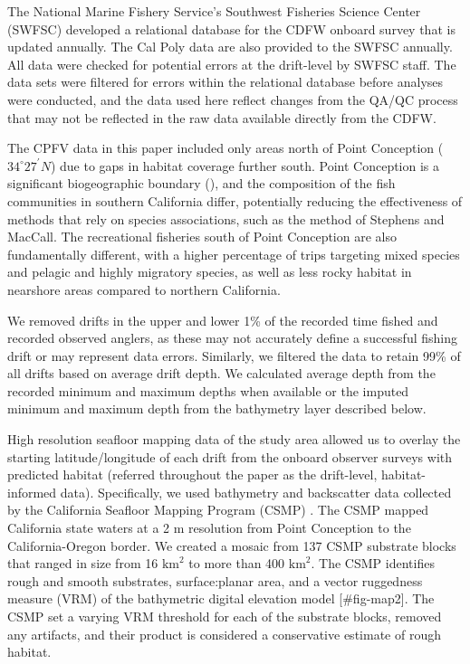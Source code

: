 \documentclass[
  12pt,
  authoryear,
  preprint,
  3p]{elsarticle}
\begin{document}
The National Marine Fishery Service's Southwest Fisheries Science Center
(SWFSC) developed a relational database for the CDFW onboard survey
\citeyearpar{Monk:2014:DRD} that is updated annually. The Cal Poly data
are also provided to the SWFSC annually. All data were checked for
potential errors at the drift-level by SWFSC staff. The data sets were
filtered for errors within the relational database before analyses were
conducted, and the data used here reflect changes from the QA/QC process
that may not be reflected in the raw data available directly from the
CDFW.

The CPFV data in this paper included only areas north of Point
Conception (\(34^\circ 27^\prime N\)) due to gaps in habitat coverage
further south. Point Conception is a significant biogeographic boundary
(\citet{Valentine:1966:NAM}), and the composition of the fish
communities in southern California differ, potentially reducing the
effectiveness of methods that rely on species associations, such as the
method of Stephens and MacCall. The recreational fisheries south of
Point Conception are also fundamentally different, with a higher
percentage of trips targeting mixed species and pelagic and highly
migratory species, as well as less rocky habitat in nearshore areas
compared to northern California.

We removed drifts in the upper and lower 1\% of the recorded time fished
and recorded observed anglers, as these may not accurately define a
successful fishing drift or may represent data errors. Similarly, we
filtered the data to retain 99\% of all drifts based on average drift
depth. We calculated average depth from the recorded minimum and maximum
depths when available or the imputed minimum and maximum depth from the
bathymetry layer described below.

High resolution seafloor mapping data of the study area allowed us to
overlay the starting latitude/longitude of each drift from the onboard
observer surveys with predicted habitat (referred throughout the paper
as the drift-level, habitat-informed data). Specifically, we used
bathymetry and backscatter data collected by the California Seafloor
Mapping Program (CSMP) \citep{Golden:2013:CSW, CSUMB:2014:CSM}. The CSMP
mapped California state waters at a 2 m resolution from Point Conception
to the California-Oregon border. We created a mosaic from 137 CSMP
substrate blocks that ranged in size from 16 \(\mathrm{km}^2\) to more
than 400 \(\mathrm{km}^2\). The CSMP identifies rough and smooth
substrates, surface:planar area, and a vector ruggedness measure (VRM)
of the bathymetric digital elevation model {[}\#fig-map2{]}. The CSMP
set a varying VRM threshold for each of the substrate blocks, removed
any artifacts, and their product is considered a conservative estimate
of rough habitat.
\end{document}

